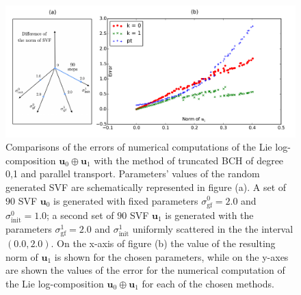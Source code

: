 \begin{figure}[!ht]
	\hspace{-1.5cm}
	\includegraphics[scale=0.6]{figures/SVF_scatter_plot.pdf}
	\caption{Comparisons of the errors of numerical computations of the Lie log-composition $\mathbf{u}_0\oplus \mathbf{u}_1$ with the method of truncated BCH of degree 0,1 and parallel transport. Parameters' values of the random generated SVF are schematically represented in figure (a). A set of $90$ SVF $\mathbf{u}_0$ is generated with fixed parameters $\sigma_{\text{gf}}^{0} = 2.0$ and $\sigma_{\text{init}}^{0} = 1.0$; a second set of $90$ SVF  $\mathbf{u}_1$ is generated with the parameters $\sigma_{\text{gf}}^{1} = 2.0$ and $\sigma_{\text{init}}^{1}$ uniformly scattered in the the interval $(0.0, 2.0)$. On the x-axis of figure (b) the value of the resulting norm of $\mathbf{u}_1$ is shown for the chosen parameters, while on the y-axes are shown the values of the error for the numerical computation of the Lie log-composition $\mathbf{u}_0\oplus \mathbf{u}_1$ for each of the chosen methods.  }
	\label{fig:SVF_scatter_plot}
\end{figure}

